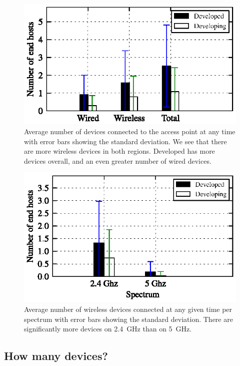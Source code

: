 \begin{figure}[t]
\includegraphics{figures/health/region_stat/region_stat_combined}
  \caption{Average number of devices connected to the access point at any time
  with error bars showing the standard deviation.  We see that there are more
  wireless devices in both regions. Developed has more devices overall, and
  an even greater number of wired devices.}
  \label{fig:avg_by_region}
\end{figure}


\begin{figure}[t]
  \includegraphics{figures/health/region_stat/region_stat_combined_wl}
\caption{Average number of wireless devices connected at any given time per
spectrum with error bars showing the standard deviation.  There are
significantly more devices on 2.4~GHz than on 5~GHz.}
  \label{fig:avg_spectrum_by_region}
\end{figure}


\subsection{How many devices?}\label{sec:devices}

